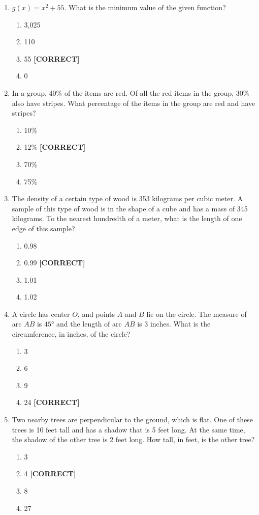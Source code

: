 \documentclass[12pt]{article}
\begin{document}
\begin{enumerate}
\item $g(x) = x^2 + 55$. What is the minimum value of the given function?
\begin{enumerate}
    \item[(a)] 3,025
    \item[(b)] 110
    \item[(c)] 55 \quad \textbf{[CORRECT]}
    \item[(d)] 0
\end{enumerate}

\item In a group, 40\% of the items are red. Of all the red items in the group, 30\% also have stripes. What percentage of the items in the group are red and have stripes?
\begin{enumerate}
    \item[(a)] 10\%
    \item[(b)] 12\% \quad \textbf{[CORRECT]}
    \item[(c)] 70\%
    \item[(d)] 75\%
\end{enumerate}

\item The density of a certain type of wood is 353 kilograms per cubic meter. A sample of this type of wood is in the shape of a cube and has a mass of 345 kilograms. To the nearest hundredth of a meter, what is the length of one edge of this sample?
\begin{enumerate}
    \item[(a)] 0.98
    \item[(b)] 0.99 \quad \textbf{[CORRECT]}
    \item[(c)] 1.01
    \item[(d)] 1.02
\end{enumerate}

\item A circle has center $O$, and points $A$ and $B$ lie on the circle. The measure of arc $AB$ is $45°$ and the length of arc $AB$ is 3 inches. What is the circumference, in inches, of the circle?
\begin{enumerate}
    \item[(a)] 3
    \item[(b)] 6
    \item[(c)] 9
    \item[(d)] 24 \quad \textbf{[CORRECT]}
\end{enumerate}

\item Two nearby trees are perpendicular to the ground, which is flat. One of these trees is 10 feet tall and has a shadow that is 5 feet long. At the same time, the shadow of the other tree is 2 feet long. How tall, in feet, is the other tree?
\begin{enumerate}
    \item[(a)] 3
    \item[(b)] 4 \quad \textbf{[CORRECT]}
    \item[(c)] 8
    \item[(d)] 27
\end{enumerate}


\end{enumerate}
\end{document}
